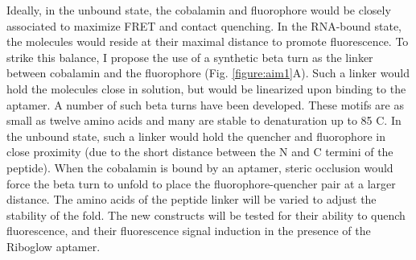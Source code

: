 Ideally, in the unbound state, the cobalamin and fluorophore would be closely associated to maximize FRET and contact quenching.\cite{LeeDesignSynthesisCharacterization2009} In the RNA-bound state, the molecules would reside at their maximal distance to promote fluorescence. To strike this balance, I propose the use of a synthetic beta turn as the linker between cobalamin and the fluorophore (Fig. \ref{figure:aim1}A). Such a linker would hold the molecules close in solution, but would be linearized upon binding to the aptamer. A number of such beta turns have been developed. These motifs are as small as twelve amino acids and many are stable to denaturation up to 85 C.\cite{KierProbingLowerSize2008} In the unbound state, such a linker would hold the quencher and fluorophore in close proximity (due to the short distance between the N and C termini of the peptide). When the cobalamin is bound by an aptamer, steric occlusion would force the beta turn to unfold to place the fluorophore-quencher pair at a larger distance. The amino acids of the peptide linker will be varied to adjust the stability of the fold. 
The new constructs will be tested for their ability to quench fluorescence, and their fluorescence signal induction in the presence of the Riboglow aptamer.

